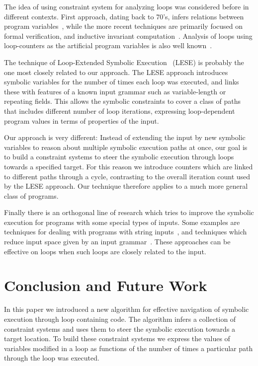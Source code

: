 \documentclass{llncs}
\begin{document}
The idea of using constraint system for analyzing loops was considered
before in different contexts. First approach, dating back to 70's, infers
relations between program variables~\cite{K76:affine_vars,CH78}, while the
more recent techniques are primarily focused on formal verification, and
inductive invariant computation~\cite{BHMR07,GSV08}. 
 Analysis of loops using loop-counters as the
artificial program variables is also well known~\cite{progAnalysis}.

The technique of Loop-Extended Symbolic Execution~\cite{SPmCS09} (LESE) is
probably the one most closely related to our approach. The LESE approach
introduces symbolic variables for the number of times each loop was
executed, and links these with features of a known input grammar such as
variable-length or repeating fields. This allows the symbolic constraints to
cover a class of paths that includes different number of loop iterations,
expressing loop-dependent program values in terms of properties of the input.

Our approach is very different: Instead of extending the input by new
symbolic variables to reason about multiple symbolic execution paths at
once, our goal is to build a constraint systems to steer the symbolic execution through loops towards a
specified target. For this reason we introduce counters which are linked to
different paths through a cycle, contrasting to the overall iteration count
used by the LESE approach. Our technique therefore applies to a much more
general class of programs.

Finally there is an orthogonal line of research which tries to improve the
symbolic execution for programs with some special types of inputs. Some
examples are techniques for dealing with programs with
string inputs~\cite{BTV09,XGM08}, and techniques which reduce input space
given by an input grammar~\cite{GKL08,SPmCS09}. These approaches can be
effective on loops when such loops are closely related to the input. 




\section{Conclusion and Future Work}
\label{sec:Conclusions}

In this paper we introduced a new algorithm for effective navigation of symbolic
execution through loop containing code. The algorithm infers a collection of
constraint systems and uses them to steer the symbolic execution towards a target
location. To build these constraint systems we express the values of
variables modified in a loop as functions of the number of times a
particular path through the  loop was executed. 
\end{document}
